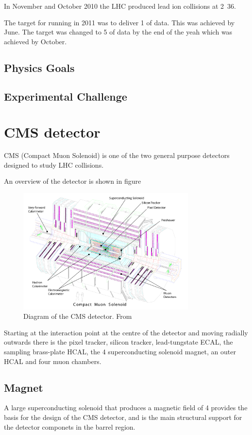 In November and October 2010 the LHC produced lead ion collisions at
\unit{2.36}{\TeV}.

The target for running in 2011 was to deliver \unit{1}{\invfb} of data. This was
achieved by June. The target was changed to \unit{5}{\invfb} of data by the end
of the yeah which was achieved by October.

\subsection{Physics Goals}

\subsection{Experimental Challenge}


\section{CMS detector}
CMS (Compact Muon Solenoid)\cite{cms} is one of the two general purpose
detectors designed to study LHC collisions. 

An overview of the detector is shown in figure 
\begin{figure}[htb!]
  \centering
  \includegraphics[width=0.8\textwidth]{cms}
  \caption{Diagram of the CMS detector. From \cite{cms}}
  \label{fig:CMSnc}
\end{figure}

Starting at the interaction point at the centre of the detector and moving
radially outwards there is the pixel tracker, silicon tracker, lead-tungstate
ECAL, the sampling brass-plate HCAL, the \unit{4}{\tesla} superconducting
solenoid magnet, an outer HCAL and four muon chambers.

\subsection{Magnet}
A large superconducting solenoid that produces a magnetic field of
\unit{4}{\tesla} provides the basis for the design of the CMS detector, and is
the main structural support for the detector componets in the barrel region.

